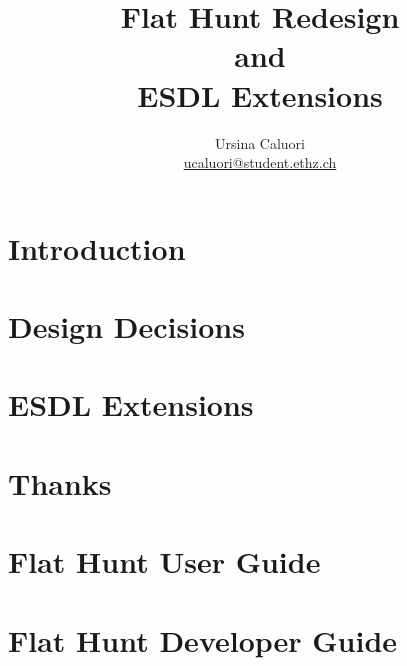 \documentclass[a4paper,titlepage,12pt]{article}
\title{\textbf{Flat Hunt Redesign \\ and \\ ESDL Extensions}}
\author{Ursina Caluori\\ \href{mailto: ucaluori@student.ethz.ch}{ucaluori@student.ethz.ch}}
\begin{document}
  \maketitle
  \tableofcontents
  \pagebreak

  \section{Introduction}
    
  \section{Design Decisions}
    
  \section{ESDL Extensions}
    
  \section{Thanks}
        
  
    
  \pagebreak
  
  \appendix
  \section{Flat Hunt User Guide}
  
  
  \pagebreak
  
  \section{Flat Hunt Developer Guide}
   
  
\end{document}
